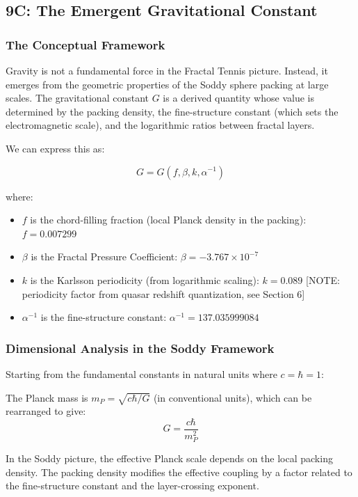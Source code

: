 \documentclass[11pt,a4paper]{article}
\begin{document}
\subsection{9C: The Emergent Gravitational Constant}

\subsubsection{The Conceptual Framework}

Gravity is not a fundamental force in the Fractal Tennis picture. Instead, it emerges from the geometric properties of the Soddy sphere packing at large scales. The gravitational constant $G$ is a derived quantity whose value is determined by the packing density, the fine-structure constant (which sets the electromagnetic scale), and the logarithmic ratios between fractal layers.

We can express this as:

\[
G = G(f, \beta, k, \alpha^{-1})
\]

where:
\begin{itemize}
\item $f$ is the chord-filling fraction (local Planck density in the packing): $f = 0.007299$
\item $\beta$ is the Fractal Pressure Coefficient: $\beta = -3.767 \times 10^{-7}$
\item $k$ is the Karlsson periodicity (from logarithmic scaling): $k = 0.089$ [NOTE: periodicity factor from quasar redshift quantization, see Section 6]
\item $\alpha^{-1}$ is the fine-structure constant: $\alpha^{-1} = 137.035999084$
\end{itemize}

\subsubsection{Dimensional Analysis in the Soddy Framework}

Starting from the fundamental constants in natural units where $c = \hbar = 1$:

The Planck mass is $m_P = \sqrt{c\hbar/G}$ (in conventional units), which can be rearranged to give:
\[
G = \frac{c\hbar}{m_P^2}
\]

In the Soddy picture, the effective Planck scale depends on the local packing density. The packing density modifies the effective coupling by a factor related to the fine-structure constant and the layer-crossing exponent.
\end{document}
